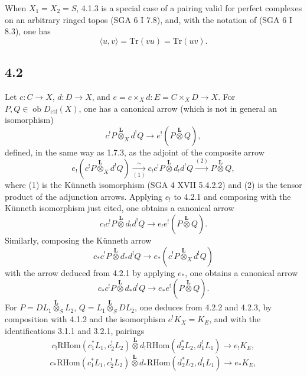 \documentclass[11pt]{article}
\newcommand{\ob}{\operatorname{ob}}
\providecommand{\RHom}{\mathrm{RHom}}
\providecommand{\Dctf}{D_{\mathrm{ctf}}}
\begin{document}
When $X_1=X_2=S$, 4.1.3 is a special case of a pairing valid for perfect complexes on an arbitrary ringed topos (SGA 6 I 7.8), and, with the notation of (SGA 6 I 8.3), one has
\begin{equation}
\langle u,v\rangle=\mathrm{Tr}(vu)=\mathrm{Tr}(uv).
\tag{4.1.5}
\end{equation}

\subsection*{4.2}
Let $c:C\to X$, $d:D\to X$, and $e=c\times_Xd:E=C\times_XD\to X$. For $P,Q\in\ob\Dctf(X)$, one has a canonical arrow (which is not in general an isomorphism)
\begin{equation}
c^!P\overset{\mathbf L}{\otimes}_X d^!Q
\longrightarrow e^!(P\overset{\mathbf L}{\otimes}Q),
\tag{4.2.1}
\end{equation}
defined, in the same way as 1.7.3, as the adjoint of the composite arrow
\[
e_!(c^!P\overset{\mathbf L}{\otimes}_X d^!Q)
\xrightarrow[(1)]{\sim}
 c_!c^!P\overset{\mathbf L}{\otimes}d_!d^!Q
\xrightarrow{(2)} P\overset{\mathbf L}{\otimes}Q,
\]
where (1) is the Künneth isomorphism (SGA 4 XVII 5.4.2.2) and (2) is the tensor product of the adjunction arrows. Applying $e_!$ to 4.2.1 and composing with the Künneth isomorphism just cited, one obtains a canonical arrow
\begin{equation}
c_!c^!P\overset{\mathbf L}{\otimes}d_!d^!Q
\longrightarrow e_!e^!(P\overset{\mathbf L}{\otimes}Q).
\tag{4.2.2}
\end{equation}
Similarly, composing the Künneth arrow
\[
c_*c^!P\overset{\mathbf L}{\otimes}d_*d^!Q
\longrightarrow e_*(c^!P\overset{\mathbf L}{\otimes}_X d^!Q)
\]
with the arrow deduced from 4.2.1 by applying $e_*$, one obtains a canonical arrow
\begin{equation}
c_*c^!P\overset{\mathbf L}{\otimes}d_*d^!Q
\longrightarrow e_*e^!(P\overset{\mathbf L}{\otimes}Q).
\tag{4.2.3}
\end{equation}
For $P=DL_1\overset{\mathbf L}{\otimes}_S L_2$, $Q=L_1\overset{\mathbf L}{\otimes}_S DL_2$, one deduces from 4.2.2 and 4.2.3, by composition with 4.1.2 and the isomorphism $e^!K_X=K_E$, and with the identifications 3.1.1 and 3.2.1, pairings
\begin{equation}
c_!\RHom(c_1^*L_1,c_2^!L_2)\overset{\mathbf L}{\otimes}
 d_!\RHom(d_2^*L_2,d_1^!L_1)
\longrightarrow e_!K_E,
\tag{4.2.4}
\end{equation}
\begin{equation}
c_*\RHom(c_1^*L_1,c_2^!L_2)\overset{\mathbf L}{\otimes}
 d_*\RHom(d_2^*L_2,d_1^!L_1)
\longrightarrow e_*K_E,
\tag{4.2.4'}
\end{equation}
\end{document}
